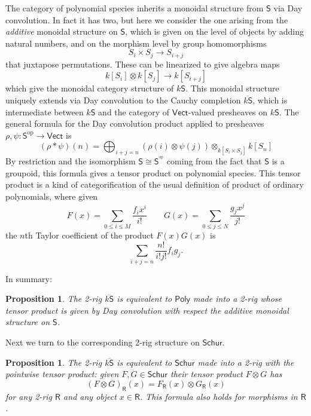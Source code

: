 \documentclass[12pt,reqno]{amsart}
\theoremstyle{plain}
\newtheorem{prop}[thm]{Proposition}
\theoremstyle{definition}
\theoremstyle{remark}
\newcommand{\maps}{\colon}
\newcommand{\op}{^\mathrm{op}}
\newcommand{\category}[1]{\mathsf{#1}}
\newcommand{\R}{\category R}
\renewcommand{\S}{\category S}
\newcommand{\namedcat}[1]{\mathsf{#1}}
\newcommand{\Poly}{\namedcat{Poly}}
\newcommand{\Schur}{\namedcat{Schur}}
\newcommand{\Vect}{\namedcat{Vect}}
\newcommand{\ksbar}{\overline{k\S}}
\numberwithin{thm}{section}
\begin{document}
The category of polynomial species inherits a monoidal structure from $\S$ via Day convolution. In fact it has two, but here we consider the one arising from the \emph{additive} monoidal structure on $\S$, which is given on the level of objects by adding natural numbers, and on the morphism level by group homomorphisms 
\[
    S_i \times S_j \to S_{i+j}
\] 
that juxtapose permutations. These can be linearized to give algebra maps 
\[
    k[S_i] \otimes k[S_j] \to k[S_{i+j}]
\] 
which give the monoidal category structure of $k\S$. This monoidal structure uniquely extends via Day convolution to the Cauchy completion $\ksbar$, which is intermediate between $k\S$ and the category of $\Vect$-valued presheaves on $k\S$. The general formula for the Day convolution product applied to presheaves $\rho, \psi \maps \S\op \to \Vect$ is 
\[
    (\rho \ast \psi)(n) = \bigoplus_{i+j = n} (\rho(i) \otimes \psi(j)) \otimes_{k[S_i \times S_j]} k[S_n] 
\]
By restriction and the isomorphism $\S \cong \S^{\op}$ coming from the fact that $\S$ is a groupoid, this formula gives a tensor product on polynomial species. This tensor product is a kind of categorification of the usual definition of product of ordinary polynomials, where given 
\[
    F(x) = \sum_{0 \leq i \leq M} \frac{f_i x^i}{i!} \qquad G(x) = \sum_{0 \leq j \leq N} \frac{g_j x^j}{j!}
\]
the $n$th Taylor coefficient of the product $F(x)G(x)$ is 
\[
    \sum_{i+j = n} \frac{n!}{i! j!} f_i g_j.
\] 

In summary: 
\begin{prop}
\label{prop:poly_2rig}
    The 2-rig $\ksbar$ is equivalent to $\Poly$ made into a 2-rig whose tensor product is given by Day convolution with respect the additive monoidal structure on $\S$.
\end{prop} 

Next we turn to the corresponding 2-rig structure on $\Schur$. 

\begin{prop}
    \label{prop:schur_2rig}
    The 2-rig $\ksbar$ is equivalent to $\Schur$ made into a 2-rig with the pointwise tensor product: given $F, G \in \Schur$ their tensor product $F \otimes G$ has
    \[    (F \otimes G)_\R(x) = F_\R(x) \otimes G_\R(x) \]
    for any 2-rig $\R$ and any object $x \in \R$. This formula also holds for morphisms in $\R$. 
\end{prop}
\end{document}
